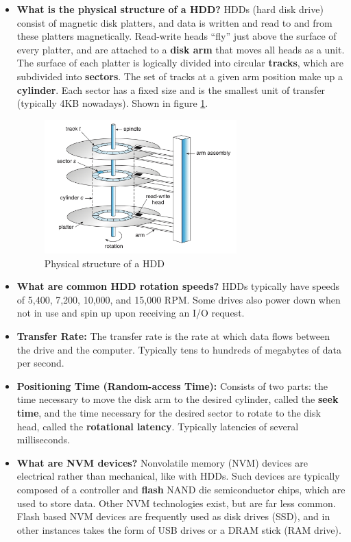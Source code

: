 \documentclass[12pt]{article}
\begin{document}
\begin{itemize}
    \item \textbf{What is the physical structure of a HDD?} HDDs (hard disk drive) consist of magnetic disk platters, and data is written and read to and from these platters magnetically. Read-write heads ``fly'' just above the surface of every platter, and are attached to a \textbf{disk arm} that moves all heads as a unit. The surface of each platter is logically divided into circular \textbf{tracks}, which are subdivided into \textbf{sectors}. The set of tracks at a given arm position make up a \textbf{cylinder}. Each sector has a fixed size and is the smallest unit of transfer (typically 4KB nowadays). Shown in figure \ref{fig:hdd}.
        \begin{figure}[ht]
            \centering
            \includegraphics[width=0.7\textwidth]{figures/hdd.jpg}
            \caption{Physical structure of a HDD}
            \label{fig:hdd}
        \end{figure}
    \item \textbf{What are common HDD rotation speeds?} HDDs typically have speeds of 5,400, 7,200, 10,000, and 15,000 RPM. Some drives also power down when not in use and spin up upon receiving an I/O request.
    \item \textbf{Transfer Rate:} The transfer rate is the rate at which data flows between the drive and the computer. Typically tens to hundreds of megabytes of data per second.
    \item \textbf{Positioning Time (Random-access Time):} Consists of two parts: the time necessary to move the disk arm to the desired cylinder, called the \textbf{seek time}, and the time necessary for the desired sector to rotate to the disk head, called the \textbf{rotational latency}. Typically latencies of several milliseconds.
    \item \textbf{What are NVM devices?} Nonvolatile memory (NVM) devices are electrical rather than mechanical, like with HDDs. Such devices are typically composed of a controller and \textbf{flash} NAND die semiconductor chips, which are used to store data. Other NVM technologies exist, but are far less common. Flash based NVM devices are frequently used as disk drives (SSD), and in other instances takes the form of USB drives or a DRAM stick (RAM drive).

\end{itemize}
\end{document}
